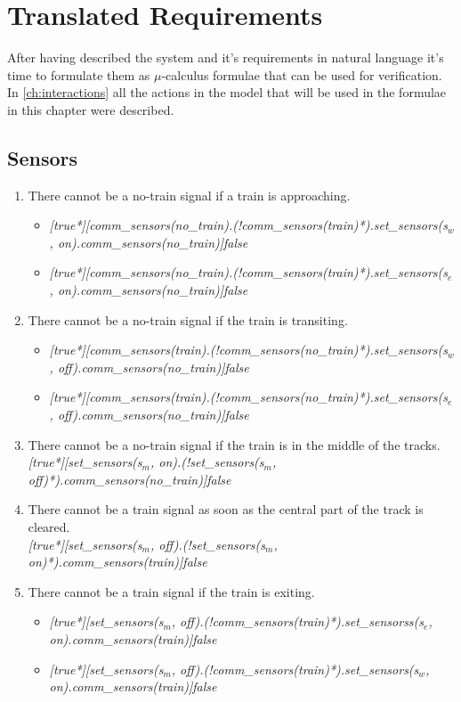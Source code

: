 \documentclass[final]{report}
\begin{document}
\chapter{Translated Requirements}
After having described the system and it's requirements in natural language it's time to formulate them as $\mu$-calculus formulae that can be used for verification. In \cref{ch:interactions} all the actions in the model that will be used in the formulae in this chapter were described.

\section{Sensors}
\begin{enumerate}
\item There cannot be a no-train signal if a train is approaching.
\begin{itemize}
\item \textit{[true*][comm\_sensors(no\_train).(!comm\_sensors(train)*).set\_sensors(s$_{w}$, on).comm\_sensors(no\_train)]false}
\item \textit{[true*][comm\_sensors(no\_train).(!comm\_sensors(train)*).set\_sensors(s$_{e}$, on).comm\_sensors(no\_train)]false} 
\end{itemize}

\item There cannot be a no-train signal if the train is transiting.
\begin{itemize}
\item \textit{[true*][comm\_sensors(train).(!comm\_sensors(no\_train)*).set\_sensors(s$_{w}$, off).comm\_sensors(no\_train)]false}
\item \textit{[true*][comm\_sensors(train).(!comm\_sensors(no\_train)*).set\_sensors(s$_{e}$, off).comm\_sensors(no\_train)]false}
\end{itemize}

\item There cannot be a no-train signal if the train is in the middle of the tracks.\\
\textit{[true*][set\_sensors(s$_{m}$, on).(!set\_sensors(s$_{m}$, off)*).comm\_sensors(no\_train)]false}

\item There cannot be a train signal as soon as the central part of the track is cleared.\\
\textit{[true*][set\_sensors(s$_{m}$, off).(!set\_sensors(s$_{m}$, on)*).comm\_sensors(train)]false
}

\item There cannot be a train signal if the train is exiting.
\begin{itemize}
\item \textit{[true*][set\_sensors(s$_{m}$, off).(!comm\_sensors(train)*).set\_sensorss(s$_{e}$, on).comm\_sensors(train)]false}
\item \textit{[true*][set\_sensors(s$_{m}$, off).(!comm\_sensors(train)*).set\_sensors(s$_{w}$, on).comm\_sensors(train)]false}
\end{itemize}


\end{enumerate}
\end{document}

